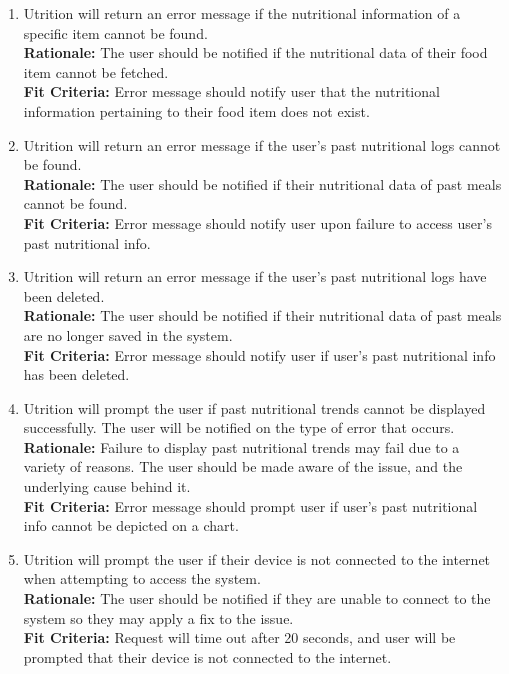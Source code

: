 \documentclass[12pt]{article}
\begin{document}
\begin{enumerate}[start=4,label={PR\arabic*.}]
	\item Utrition will return an error message if the nutritional information 
	of a specific item cannot be found.\\
	\textbf{Rationale:}  The user should be notified if the nutritional data of 
	their food item cannot be fetched.\\
	\textbf{Fit Criteria:} Error message should notify user that the nutritional 
	information pertaining to their food item does not exist.
	
	\item Utrition will return an error message if the user's past nutritional 
	logs cannot be found.\\
	\textbf{Rationale:}  The user should be notified if their nutritional data 
	of past meals cannot be found.\\
	\textbf{Fit Criteria:} Error message should notify user upon failure to access 
	user's past nutritional info.
	
	\item Utrition will return an error message if the user's past nutritional 
	logs have been deleted.\\
	\textbf{Rationale:}  The user should be notified if their nutritional data 
	of past meals are no longer saved in the system.\\
	\textbf{Fit Criteria:} Error message should notify user if user's past nutritional 
	info has been deleted.
	
	\item Utrition will prompt the user if past nutritional trends cannot
	be displayed successfully. The user will be notified on the type of error 
	that occurs. \\
	\textbf{Rationale:}  Failure to display past nutritional trends may fail 
	due to a variety of reasons. The user should be made aware of the issue, 
	and the underlying cause behind it.\\	
	\textbf{Fit Criteria:} Error message should prompt user if user's past nutritional 
	info cannot be depicted on a chart.
	
	\item Utrition will prompt the user if their device is not connected to the 
	internet when attempting to access the system. \\
	\textbf{Rationale:}  The user should be notified if they are unable to 
	connect to the system so they may apply a fix to the issue. \\	
	\textbf{Fit Criteria:} Request will time out after 20 seconds, and user will be 
	prompted that their device is not connected to the internet.
\end{enumerate}
\end{document}
